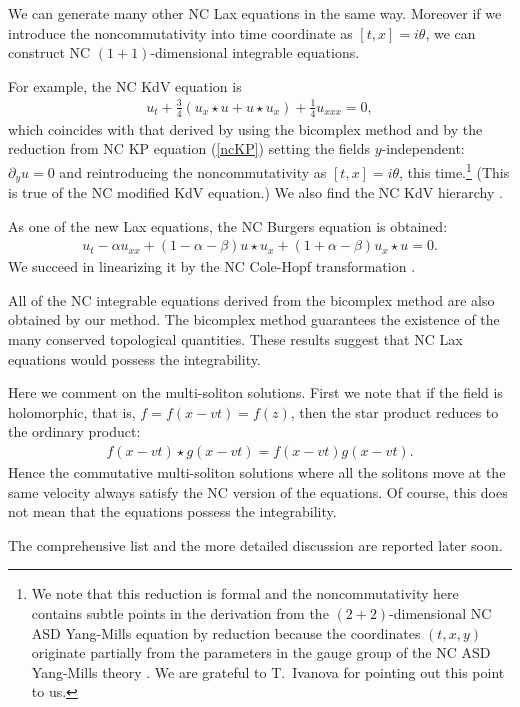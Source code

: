 \documentclass[a4paper,12pt]{article}\setlength{\topmargin}{-1cm}
\begin{document}
We can generate many other NC Lax equations in the same way.
Moreover if we introduce the noncommutativity into time coordinate
as $[t,x]=i\theta$,
we can construct NC $(1+1)$-dimensional integrable equations.

For example, the NC KdV equation is
\begin{eqnarray}
u_t+\frac{3}{4}(u_x\star u +u\star u_x)+\frac{1}{4}u_{xxx}=0,
\end{eqnarray}
which coincides with that derived by using the bicomplex method \cite{DiMH}
and by the reduction from NC KP equation (\ref{ncKP})
setting the fields $y$-independent: $\partial_y u =0$
and reintroducing the noncommutativity as $[t,x]=i\theta$, 
this time.\footnote{We note that this reduction is formal
and the noncommutativity here contains subtle points in
the derivation from the $(2+2)$-dimensional
NC ASD Yang-Mills equation by reduction
because the coordinates $(t,x,y)$
originate partially from the parameters 
in the gauge group of the NC ASD Yang-Mills theory \cite{Conj}.
We are grateful to T.~Ivanova for pointing out this point to us.}
(This is true of the NC modified KdV equation.)
We also find the NC KdV hierarchy \cite{Toda}.

As one of the new Lax equations, the NC Burgers equation is obtained:
\begin{eqnarray}
u_t-\alpha u_{xx}+(1-\alpha-\beta)u\star u_x+(1+\alpha-\beta)u_x\star u=0.
\end{eqnarray}
We succeed in linearizing it by the NC 
Cole-Hopf transformation \cite{HaTo}.

All of the NC integrable equations derived from the bicomplex method
are also obtained by our method.
The bicomplex method guarantees the existence of the 
many conserved topological quantities.
These results suggest that NC Lax equations would possess 
the integrability. 

Here we comment on the multi-soliton solutions.
First we note that 
if the field is holomorphic, that is, $f=f(x-vt)=f(z)$,
then the star product reduces to the ordinary product:
\begin{eqnarray}
f(x-vt)\star g(x-vt)=f(x-vt)g(x-vt).
\end{eqnarray}
Hence the commutative
multi-soliton solutions where all the solitons
move at the same velocity always satisfy
the NC version of the equations.
Of course, this does not mean that
the equations possess the integrability.

The comprehensive list and the more detailed discussion 
are reported later soon.
\end{document}
